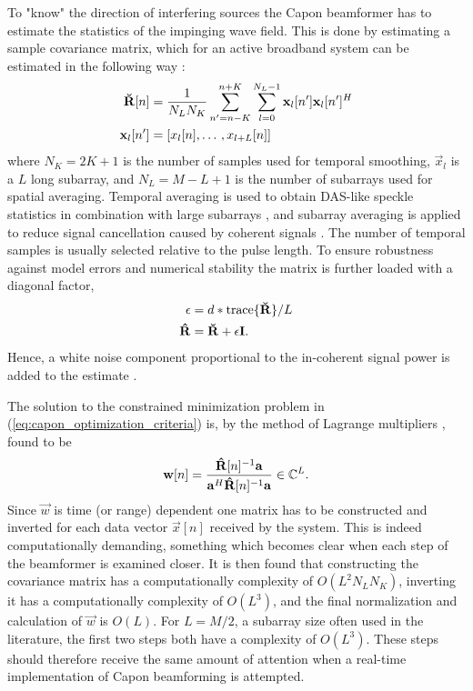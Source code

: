 To "know" the direction of interfering sources the Capon beamformer has to estimate the statistics of the impinging wave field. This is done by estimating a sample covariance matrix, which for an active broadband system can be estimated in the following way \cite{Synnevag2009}:
\begin{align}
\mathbf{\breve{R}}[n] &= \frac{1}{N_LN_K}\sum_{n'=n-K}^{n+K} \sum_{l=0}^{N_L-1} \mathbf{x}_l[n']\mathbf{x}_l[n']^H\\
\mathbf{x}_l[n'] &= [x_l[n], \dotso, x_{l+L}[n]]
\end{align}
where $N_K = 2K + 1$  is the number of samples used for temporal smoothing, $\vec{x}_l$ is a $L$ long subarray, and $N_L = M-L+1$ is the number of subarrays used for spatial averaging.  Temporal averaging is used to obtain DAS-like speckle statistics in combination with large subarrays \cite{Synnevag2007a}, and subarray averaging is applied to reduce signal cancellation caused by coherent signals \cite{Reddy1987}. The number of temporal samples is usually selected relative to the pulse length. To ensure robustness against model errors and numerical stability the matrix is further loaded with a diagonal factor, 
\begin{align}
\epsilon &= d*\text{trace}\{\mathbf{\breve{R}}\}/L\\
\mathbf{\hat{R}} &= \mathbf{\breve{R}} + \epsilon\mathbf{I}.
\end{align} 
Hence, a white noise component proportional to the in-coherent signal power is added to the estimate \cite{Featherstone1997b}.

The solution to the constrained minimization problem in (\ref{eq:capon_optimization_criteria}) is, by the method of Lagrange multipliers \cite{VanTrees2003}, found to be
\begin{align}\label{eq:capon_weights}
\mathbf{w}[n] = \frac{\mathbf{\hat{R}}[n]^{-1}\mathbf{a}}{\mathbf{a}^H\mathbf{\hat{R}}[n]^{-1}\mathbf{a}} \in \mathbb{C}^L.
\end{align}
Since $\vec{w}$ is time (or range) dependent one matrix has to be constructed and inverted for each data vector $\vec{x}[n]$ received by the system. This is indeed computationally demanding, something which becomes clear when each step of the beamformer is examined closer. It is then found that constructing the covariance matrix has a computationally complexity of $O(L^2N_LN_K)$, inverting it has a computationally complexity of $O(L^3)$, and the final normalization and calculation of $\vec{w}$ is $O(L)$. For $L=M/2$, a subarray size often used in the literature, the first two steps both have a complexity of $O(L^3)$. These steps should therefore receive the same amount of attention when a real-time implementation of Capon beamforming is attempted.

